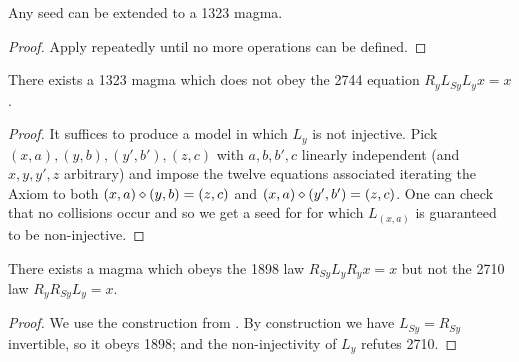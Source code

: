 \begin{corollary}\label{create-1323} Any seed can be extended to a 1323 magma.
\end{corollary}

\begin{proof}  Apply  repeatedly until no more operations can be defined.
\end{proof}

\begin{corollary}\label{1323-refute-2744}  There exists a 1323 magma which does not obey the 2744 equation $R_y L_{Sy} L_y x = x$.
\end{corollary}

\begin{proof} It suffices to produce a model in which $L_y$ is not injective. Pick $(x,a), (y,b), (y',b'), (z,c)$ with $a,b,b',c$ linearly independent (and $x,y,y',z$ arbitrary) and impose the twelve equations associated iterating the Axiom to both $(x,a) \diamond (y,b) = (z,c)$ and $(x,a) \diamond (y',b') = (z,c)$.  One can check that no collisions occur and so we get a seed for  for which $L_{(x,a)}$ is guaranteed to be non-injective.
\end{proof}

\begin{corollary}\label{1898-refute-1729}  There exists a magma which obeys the 1898 law $R_{Sy} L_y R_y x = x$ but not the 2710 law $R_y R_{Sy} L_y = x$.
\end{corollary}

\begin{proof}  We use the construction from .  By construction we have $L_{Sy} = R_{Sy}$ invertible, so it obeys 1898; and the non-injectivity of $L_y$ refutes 2710.
\end{proof}
